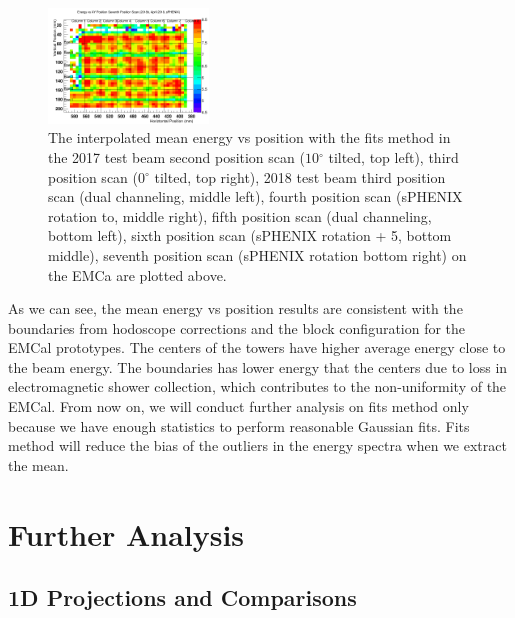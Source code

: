 \documentclass[hidelinks,11pt]{article}
\numberwithin{figure}{section}
\numberwithin{table}{section}
\newcommand{\degree}{\mbox{$^\circ$}\xspace}
\begin{document}
\begin{figure}[hbtp]
\begin{center}
\includegraphics[width=0.38\textwidth]{Plots/2018NoInterFits/EnPo20187thScan.png}
\caption{The interpolated mean energy vs position with the fits method in the 2017 test beam second position scan ($10 \degree$ tilted, top left), third position scan ($0 \degree$ tilted, top right), 2018 test beam third position scan (dual channeling, middle left), fourth position scan (sPHENIX rotation to, middle right), fifth position scan (dual channeling, bottom left), sixth position scan (sPHENIX rotation + 5, bottom middle),  seventh position scan (sPHENIX rotation bottom right) on the EMCa are plotted above.}
\label{fig:FitsWithLineMethods}
\end{center}
\end{figure} 

As we can see, the mean energy vs position results are consistent with the boundaries from hodoscope corrections and the block configuration for the EMCal prototypes. The centers of the towers have higher average energy close to the beam energy. The boundaries has lower energy that the centers due to loss in electromagnetic shower collection, which contributes to the non-uniformity of the EMCal. From now on, we will conduct further analysis on fits method only because we have enough statistics to perform reasonable Gaussian fits. Fits method will reduce the bias of the outliers in the energy spectra when we extract the mean.


\section{Further Analysis}

\subsection{1D Projections and Comparisons}
\end{document}

